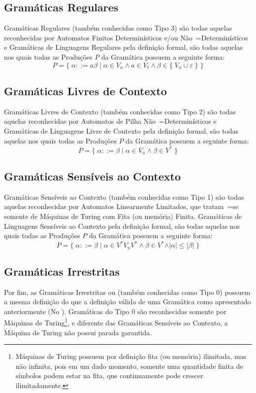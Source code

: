 {\subsection*{Gramáticas Regulares}

    Gramáticas Regulares (também conhecidas como Tipo 3) são todas aquelas reconhecidas por Automatos Finitos Determinísticos e\slash{}ou Não~=Determinísticos e
    Gramáticas de Linguagens Regulares pela definição formal,
    são todas aquelas nos quais todas as Produções $P$ da Gramática possuem a seguinte forma:
    $$ P = \{\; \alpha ::= a \beta \;|\; \alpha \in V_n \land a \in V_t
                \land \beta \in \{\; V_n \cup \varepsilon\; \} \;\} $$

\subsection*{Gramáticas Livres de Contexto}

    Gramáticas Livres de Contexto (também conhecidas como Tipo 2) \cite{hopcroftBook} são todas aquelas reconhecidas por Automatos de Pilha Não~=Determinísticos e
    Gramáticas de Linguagens Livre de Contexto pela definição formal,
    são todas aquelas nos quais todas as Produções $P$ da Gramática possuem a seguinte forma:
    $$ P = \{\; \alpha ::= \beta \;|\; \alpha \in V_n \land \beta \in V^* \;\} $$


\subsection*{Gramáticas Sensíveis ao Contexto}

    Gramáticas Sensíveis ao Contexto (também conhecidas como Tipo 1) são todas aquelas reconhecidas por Automatos Linearmente Limitados,
    que tratam~=se somente de Máquinas de Turing \cite{sipserBook} com Fita (ou memória) Finita.
    Gramáticas de Linguagens Sensíveis ao Contexto pela definição formal,
    são todas aquelas nos quais todas as Produções $P$ da Gramática possuem a seguinte forma:
    $$ P = \{\; \alpha ::= \beta \;|\; \alpha \in V^* V_n V^* \land \beta \in V^*
                \land \vert\alpha\vert \leq \vert\beta\vert \;\} $$


\subsection*{Gramáticas Irrestritas}

    Por fim,
    as Gramáticas Irrestritas ou (também conhecidas como Tipo 0) possuem a mesma definição do
    que a definição válida de uma Gramática como apresentado anteriormente (No
    ).
    Gramáticas do Tipo 0 são reconhecidas somente por Máquinas de Turing\footnote{Máquinas de Turing possuem por definição fita (ou memória) ilimitada,
    mas não infinita,
    pois em um dado momento,
    somente uma quantidade finita de símbolos podem estar na fita,
    que continuamente pode crescer ilimitadamente.
    },
    e diferente das Gramáticas Sensíveis ao Contexto,
    a Máquina de Turing não possui parada garantida.

}
